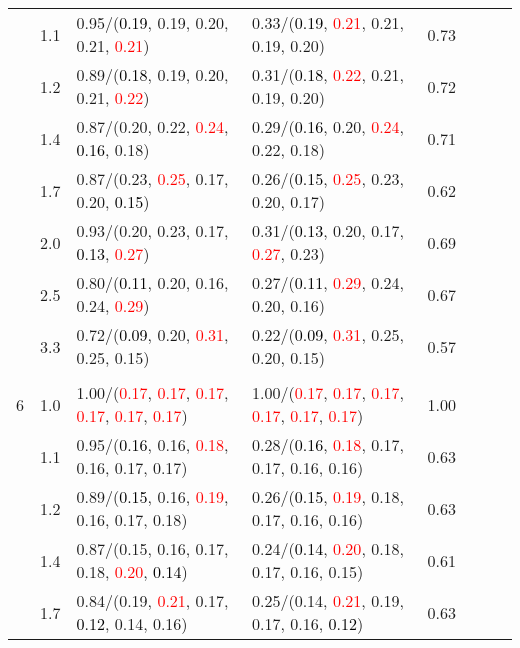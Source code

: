 \documentclass[10pt,a4paper]{report}
\begin{document}
\begin{table}[!htbp]
\begin{center}
{\begin{tabular}{ccllcccc}
			&1.1&0.95/(\textcolor{black}{0.19}, 0.19, 0.20, 0.21, \textcolor{red}{0.21})&0.33/(\textcolor{black}{0.19}, \textcolor{red}{0.21}, 0.21, 0.19, 0.20)&0.73\\
			&1.2&0.89/(\textcolor{black}{0.18}, 0.19, 0.20, 0.21, \textcolor{red}{0.22})&0.31/(\textcolor{black}{0.18}, \textcolor{red}{0.22}, 0.21, 0.19, 0.20)&0.72\\
			&1.4&0.87/(0.20, 0.22, \textcolor{red}{0.24}, \textcolor{black}{0.16}, 0.18)&0.29/(\textcolor{black}{0.16}, 0.20, \textcolor{red}{0.24}, 0.22, 0.18)&0.71\\
			&1.7&0.87/(0.23, \textcolor{red}{0.25}, 0.17, 0.20, \textcolor{black}{0.15})&0.26/(\textcolor{black}{0.15}, \textcolor{red}{0.25}, 0.23, 0.20, 0.17)&0.62\\
			&2.0&0.93/(0.20, 0.23, 0.17, \textcolor{black}{0.13}, \textcolor{red}{0.27})&0.31/(\textcolor{black}{0.13}, 0.20, 0.17, \textcolor{red}{0.27}, 0.23)&0.69\\
			&2.5&0.80/(\textcolor{black}{0.11}, 0.20, 0.16, 0.24, \textcolor{red}{0.29})&0.27/(\textcolor{black}{0.11}, \textcolor{red}{0.29}, 0.24, 0.20, 0.16)&0.67\\
			&3.3&0.72/(\textcolor{black}{0.09}, 0.20, \textcolor{red}{0.31}, 0.25, 0.15)&0.22/(\textcolor{black}{0.09}, \textcolor{red}{0.31}, 0.25, 0.20, 0.15)&0.57\\
			&&&&\\
			6			&1.0&1.00/(\textcolor{red}{0.17}, \textcolor{red}{0.17}, \textcolor{red}{0.17}, \textcolor{red}{0.17}, \textcolor{red}{0.17}, \textcolor{red}{0.17})&1.00/(\textcolor{red}{0.17}, \textcolor{red}{0.17}, \textcolor{red}{0.17}, \textcolor{red}{0.17}, \textcolor{red}{0.17}, \textcolor{red}{0.17})&1.00\\
			&1.1&0.95/(\textcolor{black}{0.16}, 0.16, \textcolor{red}{0.18}, 0.16, 0.17, 0.17)&0.28/(\textcolor{black}{0.16}, \textcolor{red}{0.18}, 0.17, 0.17, 0.16, 0.16)&0.63\\
			&1.2&0.89/(\textcolor{black}{0.15}, 0.16, \textcolor{red}{0.19}, 0.16, 0.17, 0.18)&0.26/(\textcolor{black}{0.15}, \textcolor{red}{0.19}, 0.18, 0.17, 0.16, 0.16)&0.63\\
			&1.4&0.87/(0.15, 0.16, 0.17, 0.18, \textcolor{red}{0.20}, \textcolor{black}{0.14})&0.24/(\textcolor{black}{0.14}, \textcolor{red}{0.20}, 0.18, 0.17, 0.16, 0.15)&0.61\\
			&1.7&0.84/(0.19, \textcolor{red}{0.21}, 0.17, \textcolor{black}{0.12}, 0.14, 0.16)&0.25/(0.14, \textcolor{red}{0.21}, 0.19, 0.17, 0.16, \textcolor{black}{0.12})&0.63\\

\end{tabular}}
\end{center}
\end{table}
\end{document}
